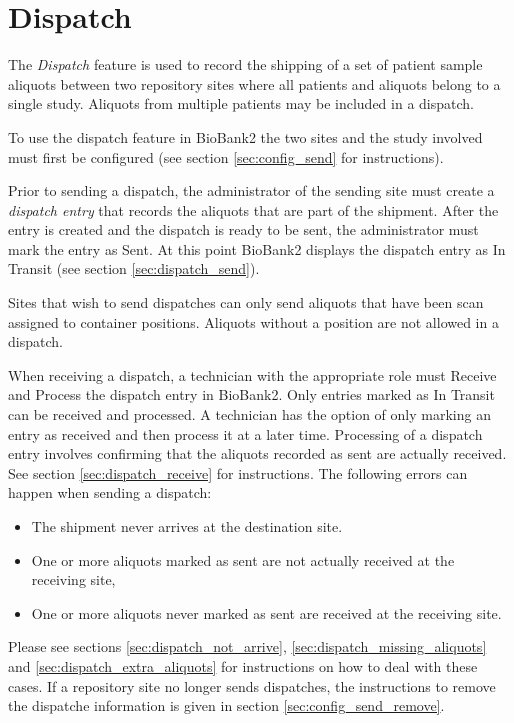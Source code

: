 \chapter{Dispatch}
The \emph{Dispatch} feature is used to record the shipping of a set of patient
sample aliquots between two repository sites where all patients and aliquots
belong to a single study.  Aliquots from multiple patients may be included in a
dispatch.

To use the dispatch feature in BioBank2 the two sites and the study involved
must first be configured (see section \ref{sec:config_send} for instructions).

Prior to sending a dispatch, the administrator of the sending site must create
a \emph{dispatch entry} that records the aliquots that are part of the
shipment. After the entry is created and the dispatch is ready to be sent, the
administrator must mark the entry as Sent. At this point BioBank2 displays the
dispatch entry as In Transit (see section \ref{sec:dispatch_send}).

Sites that wish to send dispatches can only send aliquots that have been scan
assigned to container positions. Aliquots without a position are not allowed in
a dispatch.

When receiving a dispatch, a technician with the appropriate role must Receive
and Process the dispatch entry in BioBank2. Only entries marked as In Transit
can be received and processed. A technician has the option of only marking an
entry as received and then process it at a later time. Processing of a dispatch
entry involves confirming that the aliquots recorded as sent are actually
received. See section \ref{sec:dispatch_receive} for instructions.  The
following errors can happen when sending a dispatch:
\begin{itemize}
  \item The shipment never arrives at the destination site.
  \item One or more aliquots marked as sent are not actually received at the
    receiving site,
  \item One or more aliquots never marked as sent are received at the receiving
    site.
\end{itemize}
Please see sections \ref{sec:dispatch_not_arrive},
\ref{sec:dispatch_missing_aliquots} and \ref{sec:dispatch_extra_aliquots} for
instructions on how to deal with these cases.  If a repository site no longer
sends dispatches, the instructions to remove the dispatche information is given
in section \ref{sec:config_send_remove}.
